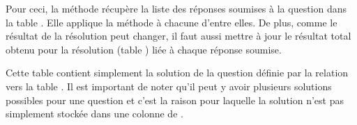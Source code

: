 \documentclass[a4,10pt,french]{sphinxmanual}
\begin{document}
\begin{fulllineitems}
\begin{fulllineitems}
Pour ceci, la méthode récupère la liste des réponses soumises à la question
dans la table . Elle applique la méthode  à 
chacune d'entre elles. De plus,
comme le résultat de la résolution peut changer, il faut aussi mettre à jour
le résultat total obtenu pour la résolution (table ) liée à chaque réponse soumise.

\end{fulllineitems}


\end{fulllineitems}


\begin{fulllineitems}
\label{database:quiz.models.SqAnswer}
Cette table contient simplement la solution de la question définie par la
relation vers la table . Il est important de noter qu'il
peut y avoir plusieurs solutions possibles pour une question et c'est la raison
pour laquelle la solution n'est pas simplement stockée dans une colonne de
{\hyperref[front-end:SimpleQuestion]{\emph{}}}.

\end{fulllineitems}

\end{document}
